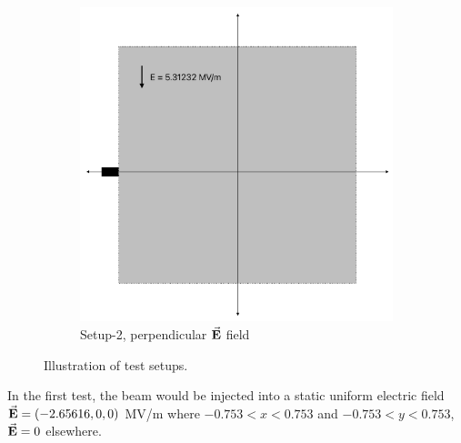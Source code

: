 \documentclass[a4paper,oneside,12pt]{report}
\numberwithin{equation}{chapter}
\begin{document}
\begin{figure}[H]
\begin{subfigure}{0.48\textwidth}
        \includegraphics[width=0.9\linewidth]{./figures/illustrations/statE_2.png}
        \caption*{Setup-2, perpendicular $\vec{\textbf{E}}$ field}
    \end{subfigure}
    \caption{Illustration of test setups.}
\end{figure}
In the first test, the beam would be injected into a static uniform electric field \\
$\vec{\textbf{E}}=(-2.65616, 0, 0)$ MV/m where $-0.753<x<0.753$ and $-0.753<y<0.753$, $\vec{\textbf{E}}=0$ elsewhere.
\end{document}
